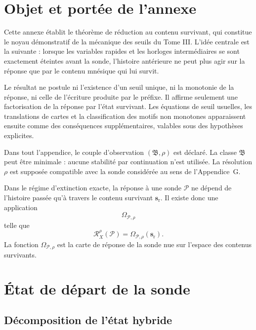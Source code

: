 \section{Objet et portée de l'annexe}
\label{annexe-H-objet}

Cette annexe établit le théorème de réduction au contenu survivant,
qui constitue le noyau démonstratif de la mécanique des seuils du
Tome III. L'idée centrale est la suivante : lorsque les variables
rapides et les horloges intermédiaires se sont exactement éteintes avant
la sonde, l'histoire antérieure ne peut plus agir sur la réponse que par
le contenu mnésique qui lui survit.

Le résultat ne postule ni l'existence d'un seuil unique, ni la monotonie
de la réponse, ni celle de l'écriture produite par le préfixe. Il affirme
seulement une factorisation de la réponse par l'état survivant. Les
équations de seuil usuelles, les translations de cartes et la
classification des motifs non monotones apparaissent ensuite comme des
conséquences supplémentaires, valables sous des hypothèses explicites.

Dans tout l'appendice, le couple d'observation $(\mathfrak B,\rho)$ est
déclaré. La classe $\mathfrak B$ peut être minimale : aucune stabilité
par continuation n'est utilisée. La résolution $\rho$ est supposée
compatible avec la sonde considérée au sens de l'Appendice~G.

\begin{encadre}[title={Résultat directeur}]
Dans le régime d'extinction exacte, la réponse à une sonde $\mathcal P$
ne dépend de l'histoire passée qu'à travers le contenu survivant
$\mathbf s_{\mathrm r}$. Il existe donc une application
\[
\Omega_{\mathcal P,\rho}
\]
telle que
\[
\mathcal R_X^{\rho}(\mathcal P)
=
\Omega_{\mathcal P,\rho}(\mathbf s_{\mathrm r}).
\]
La fonction $\Omega_{\mathcal P,\rho}$ est la carte de réponse de la
sonde nue sur l'espace des contenus survivants.
\end{encadre}

\section{État de départ de la sonde}
\label{annexe-H-etat-sonde}

\subsection{Décomposition de l'état hybride}
\label{annexe-H-decomposition}

